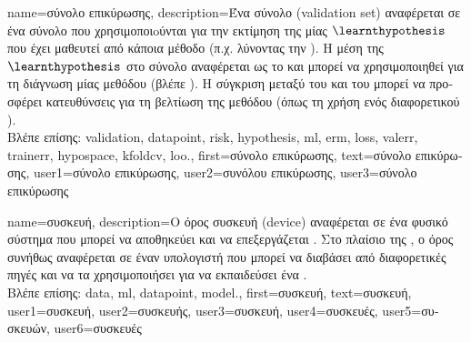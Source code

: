 {name={\foreignlanguage{greek}{σύνολο επικύρωσης}},
 	description={\foreignlanguage{greek}{Ένα σύνολο}  (validation set) 
		\foreignlanguage{greek}{αναφέρεται σε ένα σύνολο}  \foreignlanguage{greek}{που 
  		χρησιμοποι\-oύ\-νται για την εκτίμηση της}  \foreignlanguage{greek}{μίας}  $\learnthypothesis$ 
		\foreignlanguage{greek}{που έχει μαθευτεί από κάποια μέθοδο}  \foreignlanguage{greek}{(π.χ. λύνοντας την} 
		). \foreignlanguage{greek}{Η μέση}  \foreignlanguage{greek}{της} $\learnthypothesis$ 
  		\foreignlanguage{greek}{στο σύνολο}  \foreignlanguage{greek}{αναφέρεται ως το}  
		\foreignlanguage{greek}{και μπορεί να χρησιμοποιηθεί για τη διάγνωση μίας μεθόδου}  (\foreignlanguage{greek}{βλέπε} 
		\cite[\foreignlanguage{greek}{Ενότητα} 6.6]{MLBasics}). \foreignlanguage{greek}{Η σύγκριση μεταξύ του}  
		\foreignlanguage{greek}{και του}  \foreignlanguage{greek}{μπορεί να προσφέρει κατευθύνσεις για τη βελτίωση της 
		μεθόδου}  \foreignlanguage{greek}{(όπως τη χρήση ενός διαφορετικού} ).
		\\
		\foreignlanguage{greek}{Βλέπε επίσης:} \gls{validation}, \gls{datapoint}, \gls{risk}, \gls{hypothesis}, \gls{ml}, \gls{erm}, \gls{loss}, \gls{valerr}, 
		\gls{trainerr}, \gls{hypospace}, \gls{kfoldcv}, \gls{loo}.},
	first={\foreignlanguage{greek}{σύνολο επικύρωσης}},
	text={\foreignlanguage{greek}{σύνολο επικύρωσης}},
	user1={\foreignlanguage{greek}{σύνολο επικύρωσης}}, %
	user2={\foreignlanguage{greek}{συνόλου επικύρωσης}}, %
	user3={\foreignlanguage{greek}{σύνολο επικύρωσης}} %
}

{name={\foreignlanguage{greek}{συσκευή}},
	description={\foreignlanguage{greek}{Ο όρος συσκευή} (device)  
		\foreignlanguage{greek}{αναφέρεται σε ένα φυσικό σύστημα που μπορεί να}
		\foreignlanguage{greek}{αποθηκεύει και να επεξεργάζεται} . \foreignlanguage{greek}{Στο πλαίσιο της} 
		, \foreignlanguage{greek}{ο όρος συνήθως αναφέρεται σε έναν υπολογιστή που μπορεί 
		να διαβάσει}  \foreignlanguage{greek}{από διαφορετικές πηγές και να τα χρησιμοποιήσει 
		για να εκπαιδεύσει ένα}   \cite{Patterson2013}. 
		\\
		\foreignlanguage{greek}{Βλέπε επίσης:} \gls{data}, \gls{ml}, \gls{datapoint}, \gls{model}.},
	first={\foreignlanguage{greek}{συσκευή}},
	text={\foreignlanguage{greek}{συσκευή}},
	user1={\foreignlanguage{greek}{συσκευή}}, %
	user2={\foreignlanguage{greek}{συσκευής}}, %
	user3={\foreignlanguage{greek}{συσκευή}}, %
	user4={\foreignlanguage{greek}{συσκευές}}, %
	user5={\foreignlanguage{greek}{συσκευών}}, %
	user6={\foreignlanguage{greek}{συσκευές}} %
}

